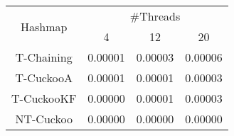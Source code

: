 \begin{tabular}{|c|c|c|c|}
\hline
\multirow{2}{*}{Hashmap} & \multicolumn{3}{c|}{\#Threads}\\\cline{2-4}& 4 & 12 & 20\\
\hline
\hline
T-Chaining & 0.00001 & 0.00003 & 0.00006\\
T-CuckooA & 0.00001 & 0.00001 & 0.00003\\
T-CuckooKF & 0.00000 & 0.00001 & 0.00003\\
NT-Cuckoo & 0.00000 & 0.00000 & 0.00000\\
\hline
\end{tabular}
